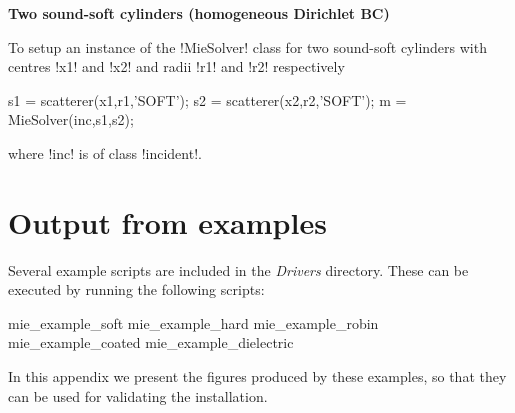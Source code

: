 \documentclass[11pt,letterpaper]{article}
\newcommand{\techheading}[1]{%
    \par\vspace{-0.3\parskip}\noindent\hspace{-1cm}\textbf{#1}%
    \par\vspace{-0.5\parskip}\noindent\nopagebreak\ignorespaces}
\begin{document}
\techheading{Two sound-soft cylinders (homogeneous Dirichlet BC)}
To setup an instance of the !MieSolver! class for
two sound-soft cylinders with centres !x1! and !x2!
and radii !r1! and !r2! respectively
\begin{matlab}
s1 = scatterer(x1,r1,'SOFT');
s2 = scatterer(x2,r2,'SOFT');
m = MieSolver(inc,s1,s2);
\end{matlab}
where !inc! is of class !incident!.



\appendix

\section{Output from examples}
\label{sec:appendix}

Several example scripts are included in the \textit{Drivers} directory.
These can be executed by running the following scripts:
\begin{matlab}
mie_example_soft
mie_example_hard
mie_example_robin
mie_example_coated
mie_example_dielectric
\end{matlab}
In this appendix we present the figures produced by these examples,
so that they can be used for validating the installation.
\end{document}
